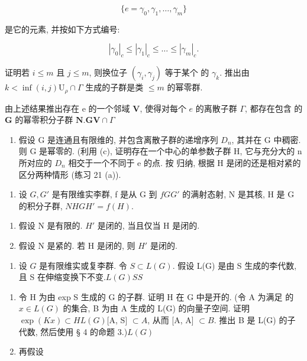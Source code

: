 \[
\{e = \gamma_ {0}, \gamma_ {1}, \dots , \gamma_ {m} \}
\]

是它的元素, 并按如下方式编号:

\[
\left| \gamma_ {0} \right| _ {c} \leqslant \left| \gamma_ {1} \right| _ {c} \leqslant \dots \leqslant \left| \gamma_ {m} \right| _ {c}.
\]

证明若 \(i \leqslant m\) 且 \(j \leqslant m\), 则换位子 \((\gamma_{i}, \gamma_{j})\) 等于某个  的 \(\gamma_{k}\). 推出由 \(k < \inf(i,j)\)\(\mathrm{U}_{\rho} \cap \Gamma\) 生成的子群是类 \(\leqslant m\) 的幂零群.

由上述结果推出存在 e 的一个邻域 \(\mathbf{V}\), 使得对每个 \(e\) 的离散子群 \(\Gamma\), 都存在包含  的 \(\mathbf{G}\) 的幂零积分子群 \(\mathbf{N}\).\(\mathbf{G}\)\(\mathbf{V} \cap \Gamma\)

\begin{enumerate}
\def\labelenumi{(\alph{enumi})}
\setcounter{enumi}{3}
\tightlist
\item
  假设 G 是连通且有限维的, 并包含离散子群的递增序列 \(D_{n}\), 其并在 G 中稠密. 则 G 是幂零的. (利用 (c), 证明存在一个中心的单参数子群 H, 它与充分大的 n 所对应的 \(D_{n}\) 相交于一个不同于 e 的点. 按  归纳, 根据 H 是闭的还是相对紧的区分两种情形 (练习 21 (a)).
\end{enumerate}

\begin{enumerate}
\def\labelenumi{\arabic{enumi}.}
\setcounter{enumi}{23}
\tightlist
\item
  设 \(G, G'\) 是有限维实李群, f 是从 G 到 \(f\)\(G\)\(G'\) 的满射态射, N 是其核, H 是 G 的积分子群, \(N\)\(H\)\(G\)\(H' = f(H)\).
\end{enumerate}

\begin{enumerate}
\def\labelenumi{(\alph{enumi})}
\item
  假设 N 是有限的. \(H'\) 是闭的, 当且仅当 H 是闭的.
\item
  假设 N 是紧的. 若 H 是闭的, 则 \(H'\) 是闭的.
\end{enumerate}

\begin{enumerate}
\def\labelenumi{\arabic{enumi}.}
\setcounter{enumi}{24}
\tightlist
\item
  设 \(G\) 是有限维实或复李群. 令 \(S \subset L(G)\). 假设 L(G) 是由 S 生成的李代数, 且 S 在伸缩变换下不变.\(L(G)\)\(S\)\(S\)
\end{enumerate}

\begin{enumerate}
\def\labelenumi{(\alph{enumi})}
\item
  令 H 为由 exp S 生成的 G 的子群. 证明 H 在 G 中是开的. (令 A 为满足  的 \(x \in L(G)\) 的集合, B 为由 A 生成的 L(G) 的向量子空间. 证明 \(\exp(Kx) \subset H\)\(L(G)\){[}A, S{]} \(\subset A\), 从而 {[}A, A{]} \(\subset B\). 推出 B 是 L(G) 的子代数, 然后使用 § 4 的命题 3.)\(L(G)\)
\item
  再假设
\end{enumerate}

